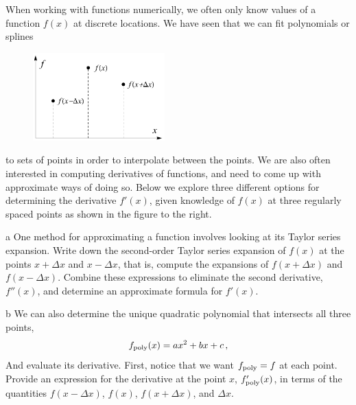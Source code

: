 \documentclass[]{homework}
\begin{document}
\begin{problem}{2}
  When working with functions numerically,
  we often only know values of a
        function $f(x)$ at
      discrete locations. We have seen that we can fit polynomials or splines

    \begin{minipage}[t]{\linewidth}
      \vspace{-1.4  em}
      \begin{figure}
        \vspace{-1.5em}
        \includegraphics[width=2.0in]{examfig.pdf}
      \end{figure}
      to sets of points
      in order to interpolate between the points. We are also often interested in computing
      derivatives of functions, and need to come up with approximate ways of doing so.
      Below we explore three different options for determining the derivative $f'(x)$, given
      knowledge of $f(x)$ at three regularly spaced points as shown in the figure to the right.
    \end{minipage}

  \begin{subproblem}{a}
    One method for approximating a function involves looking at its Taylor series expansion.
    Write down the second-order Taylor series expansion of $f(x)$ at the
    points $x+\Delta x$ and $x-\Delta x$, that is, compute the expansions of $f(x+\Delta x)$ and $f(x-\Delta x)$.
    Combine these expressions to eliminate the second derivative, $f''(x)$,
    and determine an approximate formula for $f'(x)$.
  \end{subproblem}
  \begin{subproblem}{b}
    We can also determine the unique quadratic polynomial that
    intersects all three points,
    \[
      f_{\rm poly}(x) = a x^2 + bx + c\,,
    \]
    And evaluate its derivative.
    First, notice that we want $f_{\rm poly} = f$ at each point.
    Provide an expression for the derivative at the point $x$, $f_{\rm poly}'(x)$,
    in terms of the quantities $f(x-\Delta x)$, $f(x)$, $f(x+\Delta x)$, and $\Delta x$.


\end{subproblem}
\end{problem}
\end{document}
